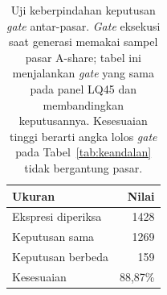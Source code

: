 \begin{table}[htbp]
\centering
\caption{Uji keberpindahan keputusan \textit{gate} antar-pasar. \textit{Gate} eksekusi saat generasi memakai sampel pasar A-share; tabel ini menjalankan \textit{gate} yang sama pada panel LQ45 dan membandingkan keputusannya. Kesesuaian tinggi berarti angka lolos \textit{gate} pada Tabel~\ref{tab:keandalan} tidak bergantung pasar.}
\label{tab:gatepasar}
\small
\begin{tabular}{lr}
\hline
Ukuran & Nilai \\
\hline
Ekspresi diperiksa & 1428 \\
Keputusan sama & 1269 \\
Keputusan berbeda & 159 \\
Kesesuaian & 88,87\% \\
\hline
\end{tabular}
\end{table}
